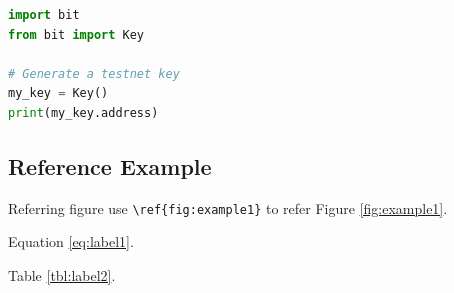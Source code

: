 \begin{lstlisting}[language=Python, caption={Example Python Source Code}]
import bit
from bit import Key

# Generate a testnet key
my_key = Key()
print(my_key.address)
\end{lstlisting}


\subsection{Reference Example}

Referring figure use \lstinline|\ref{fig:example1}| to refer Figure \ref{fig:example1}.

Equation \ref{eq:label1}. 

Table \ref{tbl:label2}.





